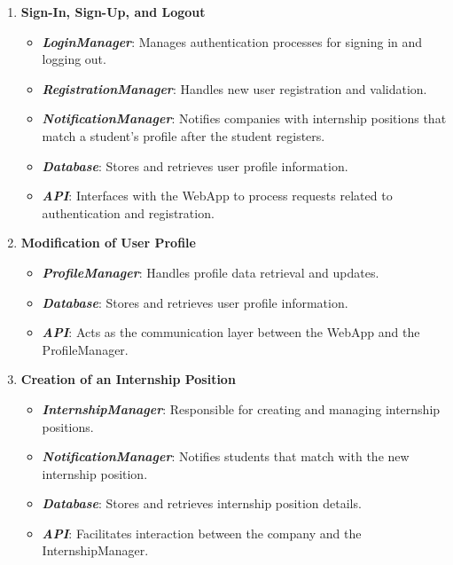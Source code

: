     \begin{enumerate}
        \item \textbf{Sign-In, Sign-Up, and Logout}
        \begin{itemize}
            \item \textit{\textbf{LoginManager}}: Manages authentication processes for signing in and logging out.
            \item \textit{\textbf{RegistrationManager}}: Handles new user registration and validation.
            \item \textit{\textbf{NotificationManager}}: Notifies companies with internship positions that match a student's profile after the student registers.
            \item \textit{\textbf{Database}}: Stores and retrieves user profile information.
            \item \textit{\textbf{API}}: Interfaces with the WebApp to process requests related to authentication and registration.
        \end{itemize}

        \item \textbf{Modification of User Profile}
        \begin{itemize}
            \item \textit{\textbf{ProfileManager}}: Handles profile data retrieval and updates.
            \item \textit{\textbf{Database}}: Stores and retrieves user profile information.
            \item \textit{\textbf{API}}: Acts as the communication layer between the WebApp and the ProfileManager.
        \end{itemize}

        \item \textbf{Creation of an Internship Position}
        \begin{itemize}
            \item \textit{\textbf{InternshipManager}}: Responsible for creating and managing internship positions.
            \item \textit{\textbf{NotificationManager}}: Notifies students that match with the new internship position.
            \item \textit{\textbf{Database}}: Stores and retrieves internship position details.
            \item \textit{\textbf{API}}: Facilitates interaction between the company and the InternshipManager.
        \end{itemize}


\end{enumerate}
